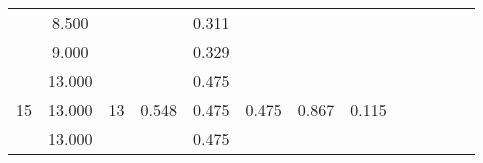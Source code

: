\documentclass[a4paper,12pt]{article}
\begin{document}
\begin{table}[htp]
\begin{tabular}{|c|c|c|c|c|c|c|c|c|c|c|c|c|}
                       & 8.500                   &                                       &                        & 0.311 &                        &                        &                        &                                                                &                                                            &                                                          &                                                          &                        \\ \cline{2-2} \cline{5-5}
                       & 9.000                   &                                       &                        & 0.329 &                        &                        &                        &                                                                &                                                            &                                                          &                                                          &                        \\ \cline{1-8}
\multirow{5}{*}{15}    & 13.000                  & \multirow{5}{*}{13}                   & \multirow{5}{*}{0.548} & 0.475 & \multirow{5}{*}{0.475} & \multirow{5}{*}{0.867} & \multirow{5}{*}{0.115} &                                                                &                                                            &                                                          &                                                          &                        \\ \cline{2-2} \cline{5-5}
                       & 13.000                  &                                       &                        & 0.475 &                        &                        &                        &                                                                &                                                            &                                                          &                                                          &                        \\ \cline{2-2} \cline{5-5}
                       & 13.000                  &                                       &                        & 0.475 &                        &                        &                        &                                                                &                                                            &                                                          &                                                          &                        \\ \cline{2-2} \cline{5-5}

\end{tabular}
\end{table}
\end{document}
